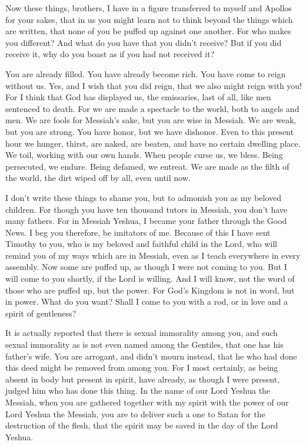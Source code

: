\myverse{}Now these things, brothers, I have in a figure transferred to myself
and Apollos for your sakes, that in us you might learn not to think beyond the things which are written,
that none of you be puffed up against one another.
\myverse{}For who makes you different? And what do you have that you didn’t receive? But
if you did receive it, why do you boast as if you had not received it?

\myverse{}You are already filled. You have already become rich. You have
come to reign without us. Yes, and I wish that you did reign, that we also might reign with you!
\myverse{}For I think that God has displayed us, the emissaries, last of all, like men
sentenced to death. For we are made a spectacle to the world, both to angels and men.
\myverse{}We are fools for Messiah’s sake, but you are wise in Messiah. We are weak,
but you are strong. You have honor, but we have dishonor.
\myverse{}Even to this present hour we hunger, thirst, are naked, are beaten, and have
no certain dwelling place.
\myverse{}We toil, working with our own hands. When people curse us, we bless. Being
persecuted, we endure.
\myverse{}Being defamed, we entreat. We are made as the filth of the world, the dirt
wiped off by all, even until now.

\myverse{}I don’t write these things to shame you, but to admonish you
as my beloved children.
\myverse{}For though you have ten thousand tutors in Messiah, you don’t have many fathers.
For in Messiah Yeshua, I became your father through the Good News.
\myverse{}I beg you therefore, be imitators of me.
\myverse{}Because of this I have sent Timothy to you, who is my beloved and faithful
child in the Lord, who will remind you of my ways which are in Messiah, even as I teach everywhere in
every assembly.
\myverse{}Now some are puffed up, as though I were not coming to you.
\myverse{}But I will come to you shortly, if the Lord is willing. And I will know, not
the word of those who are puffed up, but the power.
\myverse{}For God’s Kingdom is not in word, but in power.
\myverse{}What do you want? Shall I come to you with a rod, or in love and a spirit
of gentleness?


\mychapter{} \myverse*{}It is actually reported that there is sexual immorality among you,
and such sexual immorality as is not even named among the Gentiles, that one has his father’s wife.
\myverse{}You are arrogant, and didn’t mourn instead, that he who had done this deed might
be removed from among you.
\myverse{}For I most certainly, as being absent in body but present in spirit, have already,
as though I were present, judged him who has done this thing.
\myverse{}In the name of our Lord Yeshua the Messiah, when you are gathered together with
my spirit with the power of our Lord Yeshua the Messiah,
\myverse{}you are to deliver such a one to Satan for the destruction of the flesh, that
the spirit may be saved in the day of the Lord Yeshua.

